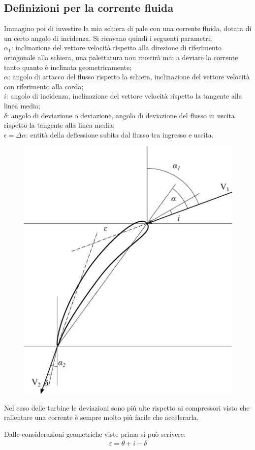 \subsection{Definizioni per la corrente fluida}
Immagino poi di investire la mia schiera di pale con una corrente fluida, dotata di un certo angolo di incidenza. Si ricavano quindi i seguenti parametri:\\[2mm]
$\alpha_1$: inclinazione del vettore velocità rispetto alla direzione di riferimento ortogonale alla schiera, una palettatura non riuscirà mai a deviare la corrente tanto quanto è inclinata geometricamente;\\
$\alpha$: angolo di attacco del flusso rispetto la schiera, inclinazione del vettore velocità con riferimento alla corda;\\
$i$: angolo di incidenza, inclinazione del vettore velocità rispetto la tangente alla linea media;\\
$\delta$: angolo di deviazione o deviazione, angolo di deviazione del flusso in uscita rispetto la tangente alla linea media;\\
$\epsilon = \Delta \alpha$: entità della deflessione subita dal flusso tra ingresso e uscita.\\[2mm]
\begin{figure}
\centering
  \includegraphics[width=.45\textwidth]{fig/palasing.pdf}
\caption{}
\label{fig:palasing}
\end{figure}
Nel caso delle turbine le deviazioni sono più alte rispetto ai compressori visto che rallentare una corrente è sempre molto più facile che accelerarla. 

Dalle considerazioni geometriche viste prima si può scrivere:
\begin{align*}
\varepsilon = \theta + i - \delta
\end{align*}

